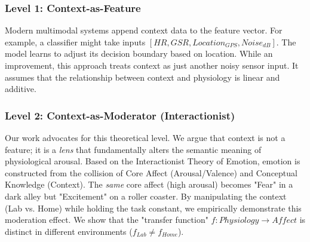\documentclass[journal]{IEEEtran}
\begin{document}
\subsubsection{Level 1: Context-as-Feature}
Modern multimodal systems append context data to the feature vector. For example, a classifier might take inputs $[HR, GSR, Location_{GPS}, Noise_{dB}]$. The model learns to adjust its decision boundary based on location.
While an improvement, this approach treats context as just another noisy sensor input. It assumes that the relationship between context and physiology is linear and additive.

\subsubsection{Level 2: Context-as-Moderator (Interactionist)}
Our work advocates for this theoretical level. We argue that context is not a feature; it is a \textit{lens} that fundamentally alters the semantic meaning of physiological arousal.
Based on the Interactionist Theory of Emotion, emotion is constructed from the collision of Core Affect (Arousal/Valence) and Conceptual Knowledge (Context). The \textit{same} core affect (high arousal) becomes "Fear" in a dark alley but "Excitement" on a roller coaster.
By manipulating the context (Lab vs. Home) while holding the task constant, we empirically demonstrate this moderation effect. We show that the "transfer function" $f: Physiology \to Affect$ is distinct in different environments ($f_{Lab} \neq f_{Home}$).
\end{document}
